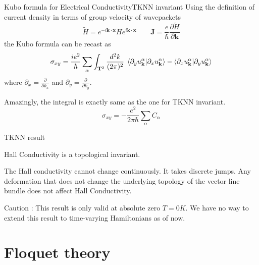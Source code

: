 \documentclass{beamer}
\begin{document}
\begin{frame}{Kubo formula for Electrical Conductivity}{TKNN invariant}
 Using the definition of current density in terms of group velocity of wavepackets
 \begin{equation*}
  \tilde{H} = e^{-i\mathbf{k}\cdot\mathbf{x}}He^{i\mathbf{k}\cdot\mathbf{x}}\qquad \mathbf{J} = \frac{e}{\hbar}\frac{\partial \tilde{H}}{\partial \mathbf{k}}
 \end{equation*} the Kubo formula can be recast as
 \begin{equation}
  \sigma_{xy} = \frac{ie^2}{\hbar}\sum_{\alpha}\int_{\mathbf{T}^2}\frac{d^2k}{(2\pi)^2}\; \braket{\partial_{y}u_{\mathbf{k}}^{\alpha}|\partial_{x}u_{\mathbf{k}}^{\alpha}} - \braket{\partial_{x}u_{\mathbf{k}}^{\alpha}|\partial_{y}u_{\mathbf{k}}^{\alpha}}
 \end{equation} where $\partial_{x} = \frac{\partial}{\partial k_{x}}$ and $\partial_{y} = \frac{\partial}{\partial k_{y}}$.

 Amazingly, the integral is exactly same as the one for TKNN invariant.
\begin{equation}
 \sigma_{xy} = -\frac{e^2}{2\pi\hbar}\sum_{\alpha}C_{\alpha}
\end{equation}
\end{frame}

\begin{frame}{TKNN result}
 \begin{theorem}
 Hall Conductivity is a topological invariant.
\end{theorem}

The Hall conductivity cannot change continuously. It takes discrete jumps. Any deformation that does not change the underlying topology of the vector line bundle does not affect
Hall Conductivity.

\alert{Caution} : This result is only valid at absolute zero $T = 0 K$. We have no way to extend this result to time-varying Hamiltonians as of now.
\end{frame}

\section{Floquet theory}
\end{document}
